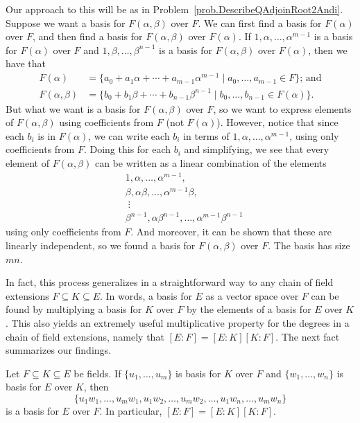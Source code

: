 Our approach to this will be as in Problem~\ref{prob.DescribeQAdjoinRoot2Andi}. Suppose we want a basis for $F(\alpha,\beta)$ over $F$. We can first find a basis for $F(\alpha)$ over $F$, and then find a basis for $F(\alpha,\beta)$ over $F(\alpha)$. If $1,\alpha,\ldots,\alpha^{m-1}$ is a basis for $F(\alpha)$ over $F$ and $1,\beta,\ldots,\beta^{n-1}$ is a basis for $F(\alpha,\beta)$ over $F(\alpha)$, then we have that 
\begin{align*}
F(\alpha) &= \{a_0+a_1\alpha+\cdots+a_{m-1}\alpha^{m-1}\mid a_0,\ldots,a_{m-1} \in F\}\text{; and}\\
F(\alpha,\beta) &= \{b_0+b_1\beta+\cdots+b_{n-1}\beta^{n-1}\mid b_0,\ldots,b_{n-1}\in F(\alpha)\}.
\end{align*}
But what we want is a basis for $F(\alpha,\beta)$ over $F$, so we want to express elements of $F(\alpha,\beta)$ using coefficients from $F$ (not $F(\alpha)$). However, notice that since each $b_i$ is in $F(\alpha)$, we can write each $b_i$ in terms of $1,\alpha,\ldots,\alpha^{m-1}$, using only coefficients from $F$. Doing this for each $b_i$ and simplifying, we see that every element of $F(\alpha,\beta)$ can be written as a linear combination of the elements
\begin{align*}
&1,\alpha,\ldots, \alpha^{m-1},\\ 
&\beta,\alpha\beta,\ldots, \alpha^{m-1}\beta,\\
&\;\vdots\\
&\beta^{n-1},\alpha\beta^{n-1},\ldots, \alpha^{m-1}\beta^{n-1}
\end{align*}
using only coefficients from $F$. And moreover, it can be shown that these are linearly independent, so we found a basis for $F(\alpha,\beta)$ over $F$. The basis has size $mn$.

In fact, this process generalizes in a straightforward way to any chain of field extensions $F\subseteq K \subseteq E$. In words, a basis for $E$ as a vector space over $F$ can be found by multiplying a basis for $K$ over $F$ by the elements of a basis for $E$ over $K$. This also yields an extremely useful multiplicative property for the degrees in a chain of field extensions, namely that $[E:F] = [E:K][K:F]$. The next fact summarizes our findings.

\begin{fact}\label{thm.BasisChainExtensionField}
Let $F\subseteq K \subseteq E$ be fields. If $\{u_1,\ldots,u_m\}$ is basis for $K$ over $F$ and $\{w_1,\ldots,w_n\}$ is basis for $E$ over $K$, then 
\[ \{u_1w_1,\ldots,u_mw_1,u_1w_2,\ldots,u_mw_2,\ldots,u_1w_n,\ldots,u_mw_n\}\]
is a basis for $E$ over $F$. In particular, $[E:F] = [E:K][K:F]$.
\end{fact}

